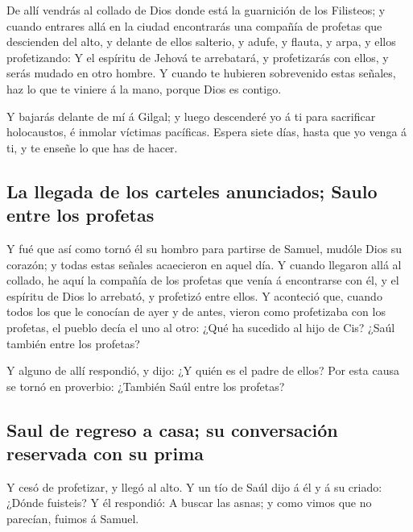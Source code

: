  De allí vendrás al collado de Dios donde está la
guarnición de los Filisteos; y cuando entrares allá en la ciudad
encontrarás una compañía de profetas que descienden del alto, y delante
de ellos salterio, y adufe, y flauta, y arpa, y ellos profetizando:
 Y el espíritu de Jehová te arrebatará, y profetizarás con
ellos, y serás mudado en otro hombre.  Y cuando te
hubieren sobrevenido estas señales, haz lo que te viniere á la mano,
porque Dios es contigo.

 Y bajarás delante de mí á Gilgal; y luego descenderé yo á
ti para sacrificar holocaustos, é inmolar víctimas pacíficas. Espera
siete días, hasta que yo venga á ti, y te enseñe lo que has de hacer.

\hypertarget{la-llegada-de-los-carteles-anunciados-saulo-entre-los-profetas}{%
\subsection{La llegada de los carteles anunciados; Saulo entre los
profetas}\label{la-llegada-de-los-carteles-anunciados-saulo-entre-los-profetas}}

 Y fué que así como tornó él su hombro para partirse de
Samuel, mudóle Dios su corazón; y todas estas señales acaecieron en
aquel día.  Y cuando llegaron allá al collado, he aquí la
compañía de los profetas que venía á encontrarse con él, y el espíritu
de Dios lo arrebató, y profetizó entre ellos.  Y
aconteció que, cuando todos los que le conocían de ayer y de antes,
vieron como profetizaba con los profetas, el pueblo decía el uno al
otro: ¿Qué ha sucedido al hijo de Cis? ¿Saúl también entre los profetas?

 Y alguno de allí respondió, y dijo: ¿Y quién es el padre
de ellos? Por esta causa se tornó en proverbio: ¿También Saúl entre los
profetas?

\hypertarget{saul-de-regreso-a-casa-su-conversaciuxf3n-reservada-con-su-prima}{%
\subsection{Saul de regreso a casa; su conversación reservada con su
prima}\label{saul-de-regreso-a-casa-su-conversaciuxf3n-reservada-con-su-prima}}

 Y cesó de profetizar, y llegó al alto.  Y
un tío de Saúl dijo á él y á su criado: ¿Dónde fuisteis? Y él respondió:
A buscar las asnas; y como vimos que no parecían, fuimos á Samuel.

